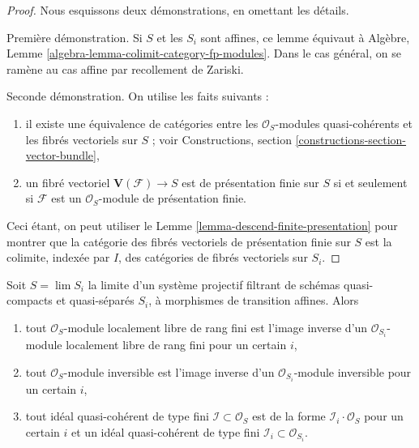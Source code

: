 \begin{proof}
Nous esquissons deux démonstrations, en omettant les détails.

\medskip\noindent
Première démonstration. Si $S$ et les $S_i$ sont affines, ce lemme
équivaut à
Algèbre, Lemme \ref{algebra-lemma-colimit-category-fp-modules}.
Dans le cas général, on se ramène au cas affine par recollement de Zariski.

\medskip\noindent
Seconde démonstration. On utilise les faits suivants :
\begin{enumerate}
\item il existe une équivalence de catégories entre les
$\mathcal{O}_S$-modules quasi-cohérents et les fibrés vectoriels sur $S$ ; voir
Constructions, section \ref{constructions-section-vector-bundle},
\item un fibré vectoriel $\mathbf{V}(\mathcal{F}) \to S$ est
de présentation finie sur $S$ si et seulement si $\mathcal{F}$
est un $\mathcal{O}_S$-module de présentation finie.
\end{enumerate}
Ceci étant, on peut utiliser le Lemme \ref{lemma-descend-finite-presentation}
pour montrer que la catégorie des fibrés vectoriels de présentation finie
sur $S$ est la colimite, indexée par $I$,
des catégories de fibrés vectoriels sur $S_i$.
\end{proof}

\begin{lemma}
\label{lemma-descend-invertible-modules}
Soit $S = \lim S_i$ la limite d'un système projectif filtrant de schémas
quasi-compacts et quasi-séparés $S_i$, à morphismes de transition affines. Alors
\begin{enumerate}
\item tout $\mathcal{O}_S$-module localement libre de rang fini est l'image inverse
d'un $\mathcal{O}_{S_i}$-module localement libre de rang fini pour un certain $i$,
\item tout $\mathcal{O}_S$-module inversible est l'image inverse d'un
$\mathcal{O}_{S_i}$-module inversible pour un certain $i$,
\item tout idéal quasi-cohérent de type fini $\mathcal{I} \subset \mathcal{O}_S$
est de la forme $\mathcal{I}_i \cdot \mathcal{O}_S$ pour un certain $i$ et un
idéal quasi-cohérent de type fini $\mathcal{I}_i \subset \mathcal{O}_{S_i}$.
\end{enumerate}
\end{lemma}


